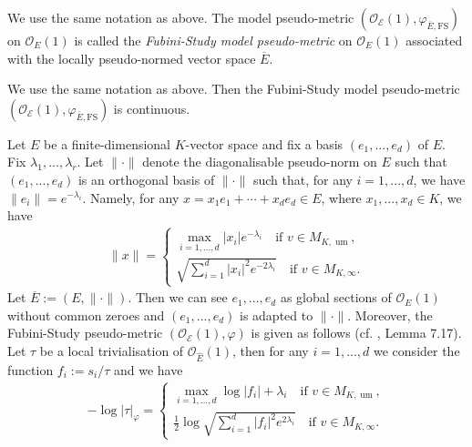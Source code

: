 \documentclass [11pt,reqno]{amsart}
\newcommand{\1}{\mathmybb{1}}
\def\cE{{\mathcal{E}}}
\def\cO{{\mathcal{O}}}
\def\um{\operatorname{um}}
\begin{document}
\begin{proposition-definition}
\label{propdef:Fubini-Study_local_pseudo_metric}
We use the same notation as above. The model pseudo-metric $(\cO_{\cE}(1),\varphi_{\overline{E},\mathrm{FS}})$ on $\cO_{E}(1)$ is called the \emph{Fubini-Study model pseudo-metric} on $\cO_{E}(1)$ associated with the locally pseudo-normed vector space $\overline{E}$.
\end{proposition-definition}

\begin{proposition}
We use the same notation as above. Then the Fubini-Study model pseudo-metric $(\cO_{\cE}(1),\varphi_{\overline{E},\mathrm{FS}})$ is continuous.
\end{proposition}

\begin{example}
\label{example:FS_local_pseudo-metric}
Let $E$ be a finite-dimensional $K$-vector space and fix a basis $(e_1,...,e_d)$ of $E$. Fix $\lambda_1,...,\lambda_r$. Let $\|\cdot\|$ denote the diagonalisable pseudo-norm on $E$ such that $(e_1,...,e_d)$ is an orthogonal basis of $\|\cdot\|$ such that, for any $i=1,...,d$, we have $\|e_i\|=e^{-\lambda_i}$. Namely, for any $x=x_1 e_1+\cdots+x_d e_d \in E$, where $x_1,...,x_d\in K$, we have
\begin{align*}
\|x\| =  \left\{\begin{matrix}
\displaystyle\max_{i=1,...,d}|x_i|e^{-\lambda_i} \quad \text{if }v\in M_{K,\um},\\
\displaystyle\sqrt{\sum_{i=1}^{d} |x_i|^{2}e^{-2\lambda_i}} \quad \text{if }v\in M_{K,\infty}.
\end{matrix}\right.
\end{align*}
Let $\overline{E}:=(E,\|\cdot\|)$. Then we can see $e_1,...,e_d$ as global sections of $\cO_{E}(1)$ without common zeroes and $(e_1,...,e_d)$ is adapted to $\|\cdot\|$. Moreover, the Fubini-Study pseudo-metric $(\cO_{\cE}(1),\varphi)$ is given as follows (cf. \cite{BoucksomEriksson}, Lemma 7.17). Let $\tau$ be a local trivialisation of $\cO_{\widehat{E}}(1)$, then for any $i=1,...,d$ we consider the function $f_i := s_i/\tau$ and we have
\begin{align*}
-\log|\tau|_{\varphi} = \left\{\begin{matrix}
\displaystyle \max_{i=1,...,d}\log|f_i| + \lambda_i \quad \text{if }v\in M_{K,\um},\\
\displaystyle\frac{1}{2}\log\sqrt{\sum_{i=1}^{d} |f_i|^{2}e^{2\lambda_i}} \quad \text{if }v\in M_{K,\infty}.
\end{matrix}\right.
\end{align*}
\end{example}
\end{document}
